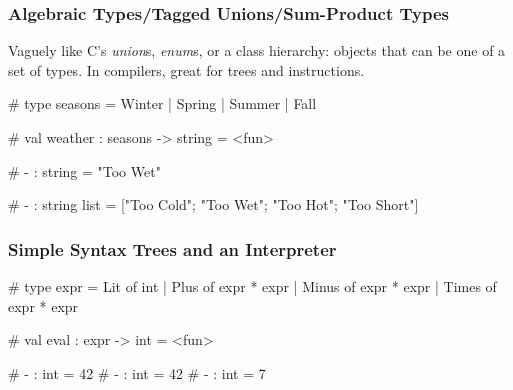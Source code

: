 \documentclass{plt}
\begin{document}
\begin{frame}[fragile]
  \frametitle{Algebraic Types/Tagged Unions/Sum-Product Types}

Vaguely like C's \emph{union}s, \emph{enum}s, or a class hierarchy:
objects that can be one of a set of types.  In compilers, great for
trees and instructions.

\begin{interactive}
# 
type seasons = Winter | Spring | Summer | Fall

# 
val weather : seasons -> string = <fun>

# 
- : string = "Too Wet"

# 
- : string list = ["Too Cold"; "Too Wet"; "Too Hot"; "Too Short"]
\end{interactive}

\end{frame}

\begin{frame}[fragile]
  \frametitle{Simple Syntax Trees and an Interpreter}

\begin{interactive}
# 
type expr =
    Lit of int
  | Plus of expr * expr
  | Minus of expr * expr
  | Times of expr * expr

# 
val eval : expr -> int = <fun>

# 
- : int = 42
# 
- : int = 42
# 
- : int = 7
\end{interactive}
\end{frame}
\end{document}
